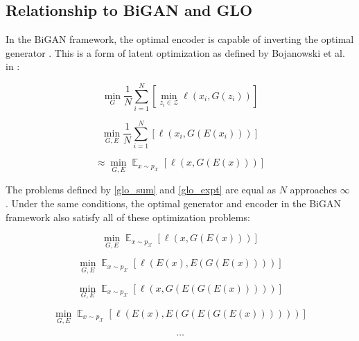 \documentclass[10pt,twocolumn,letterpaper]{article}
\DeclareMathOperator*{\E}{\mathbb{E}}
\begin{document}
\subsection{Relationship to BiGAN and GLO}

In the BiGAN framework, the optimal encoder is capable of inverting the optimal generator \cite{donahue2016bigan}.  This is a form of latent optimization as defined by Bojanowski et al. in  \cite{bojanowski2017optimizing}:

\begin{equation}
    \min_{G} \frac{1}{N}\sum_{i=1}^{N}\left[\min_{z_i\in\mathcal{Z}} \ell(x_i, G(z_i)) \right]
\end{equation}

\begin{equation}
    \min_{G, E} \frac{1}{N}\sum_{i=1}^{N}\left[ \ell(x_i, G(E(x_i))) \right]
    \label{glo_sum}
\end{equation}

\begin{equation}
    \approx \min_{G, E}  \E_{x\sim p_{\mathcal{X}}}\left[ \ell(x, G(E(x))) \right]
    \label{glo_expt}
\end{equation}

The problems defined by \eqref{glo_sum} and \eqref{glo_expt} are equal as $N$ approaches $\infty$ \cite{donahue2016bigan} . Under the same conditions, the optimal generator and encoder in the BiGAN framework also satisfy all of these optimization problems:

\begin{equation}
    \min_{G, E} \E_{x\sim p_{\mathcal{X}}}\left[ \ell(x, G(E(x))) \right]
    \label{rc_loss1}
\end{equation}

\begin{equation}
    \min_{G, E} \E_{x\sim p_{\mathcal{X}}}\left[ \ell(E(x), E(G(E(x)))) \right]
\end{equation}

\begin{equation}
    \min_{G, E} \E_{x\sim p_{\mathcal{X}}}\left[ \ell(x, G(E(G(E(x))))) \right]
    \label{rc_loss2}
\end{equation}

\begin{equation}
    \min_{G, E} \E_{x\sim p_{\mathcal{X}}}\left[ \ell(E(x), E(G(E(G(E(x)))))) \right]
\end{equation}

\begin{equation*}
    \dots
\end{equation*}
\end{document}
